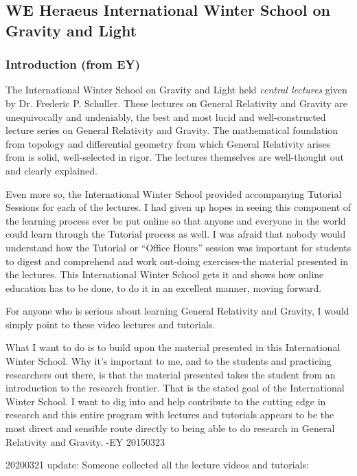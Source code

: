 \documentclass[10pt]{amsart}
\begin{document}
\begin{multicols*}{2}
\part{WE Heraeus International Winter School on Gravity and Light}

\section*{Introduction (from EY)}

The International Winter School on Gravity and Light held \emph{central lectures} given by Dr. Frederic P. Schuller. These lectures on General Relativity and Gravity are unequivocally and undeniably, the best and most lucid and well-constructed lecture series on General Relativity and Gravity.  The mathematical foundation from topology and differential geometry from which General Relativity arises from is solid, well-selected in rigor.  The lectures themselves are well-thought out and clearly explained.  

Even more so, the International Winter School provided accompanying Tutorial Sessions for each of the lectures.  I had given up hopes in seeing this component of the learning process ever be put online so that anyone and everyone in the world could learn through the Tutorial process as well.  I was afraid that nobody would understand how the Tutorial or ``Office Hours'' session was important for students to digest and comprehend and work out-doing exercises-the material presented in the lectures.  This International Winter School gets it and shows how online education has to be done, to do it in an excellent manner, moving forward.  

For anyone who is serious about learning General Relativity and Gravity, I would simply point to these video lectures and tutorials.  

What I want to do is to build upon the material presented in this International Winter School.  Why it's important to me, and to the students and practicing researchers out there, is that the material presented takes the student from an introduction to the research frontier.  That is the stated goal of the International Winter School.  I want to dig into and help contribute to the cutting edge in research and this entire program with lectures and tutorials appears to be the most direct and sensible route directly to being able to do research in General Relativity and Gravity. -EY 20150323

20200321 update: Someone collected all the lecture videos and tutorials:


\end{multicols*}
\end{document}
